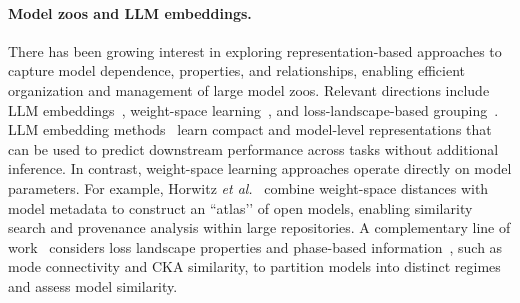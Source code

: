 \paragraph{Model zoos and LLM embeddings.} 
There has been growing interest in exploring representation-based approaches to capture model dependence, properties, and relationships, enabling efficient organization and management of large model zoos. Relevant directions include LLM embeddings~\citep{zhuang2025embedllm}, weight-space learning~\cite{horwitz2025Atlas, horwitz2025TreeHeritage, gueta2023KnowledgeRegion}, and loss-landscape-based grouping~\cite{gueta2023KnowledgeRegion, schurholt2025ModelZoo}. LLM embedding methods~\citep{zhuang2025embedllm} learn compact and model-level representations that can be used to predict downstream performance across tasks without additional inference. In contrast, weight-space learning approaches operate directly on model parameters. For example, Horwitz \emph{et al.}~\cite{horwitz2025Atlas} combine weight-space distances with model metadata to construct an ``atlas’’ of open models, enabling similarity search and provenance analysis within large repositories. A complementary line of work~\citep{schurholt2025ModelZoo} considers loss landscape properties and phase-based information~\citep{Yang2021TaxonomizingLossLandscapes}, such as mode connectivity and CKA similarity, to partition models into distinct regimes and assess model similarity. 


